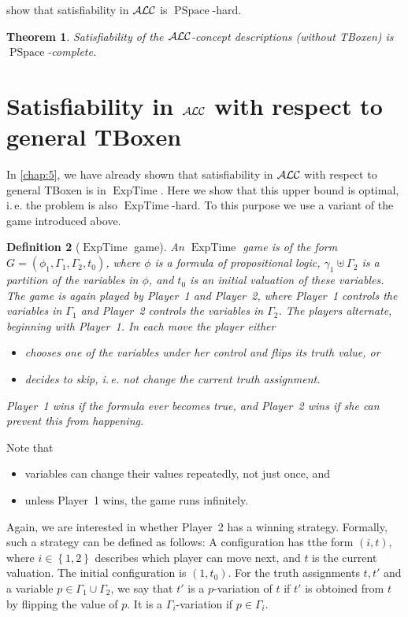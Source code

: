 \documentclass[openany]{scrbook}
\theoremstyle{break}
\newtheorem{Theorem}{Theorem}[chapter]
\newtheorem{Definition}[Theorem]{Definition}
\theoremstyle{nonumberbreak}
\theoremstyle{nonumberplain}
\theoremstyle{nonumberbreak}
\newcommand{\set}[1]{\left\{#1\right\}}
\newcommand{\ie}{i{.}\,e{.}\xspace}
\newcommand{\ALC}{{\cal A}{\cal L}{\cal C}}
\newcommand{\PSpace}{\operatorname{PSpace}}
\newcommand{\ExpTime}{\operatorname{ExpTime}}
\begin{document}
 show that satisfiability in $\ALC$ is $\PSpace$-hard.

\begin{Theorem}
  \label{6.8}
  Satisfiability of the $\ALC$-concept descriptions (without TBoxen)
  is $\PSpace$-complete.
\end{Theorem}

\section{Satisfiability in $\ALC$ with respect to general TBoxen}
In \cref{chap:5}, we have already shown that satisfiability in $\ALC$
with respect to general TBoxen is in $\ExpTime$. Here we show that
this upper bound is optimal, \ie the problem is also
$\ExpTime$-hard. To this purpose we use a variant of the game
introduced above.

\begin{Definition}[$\ExpTime$ game]
  \label{6.9}An $\ExpTime$ game is of the form $G = (\phi_1, \Gamma_1,
  \Gamma_2, t_0)$, where $\phi$ is a formula of propositional logic,
  $\gamma_1 \uplus \Gamma_2$ is a partition of the variables in
  $\phi$, and $t_0$ is an initial valuation of these variables.
  The game is again played by Player~1 and Player~2, where Player~1
  controls the variables in $\Gamma_1$ and Player~2 controls the
  variables in $\Gamma_2$. The players alternate, beginning with
  Player~1. In each move the player either
  \begin{itemize}
  \item chooses one of the variables under her control and flips its
    truth value, or
  \item decides to skip, \ie not change the current truth assignment.
  \end{itemize}
  Player~1 wins if the formula ever becomes true, and Player~2 wins if
  she can prevent this from happening.
\end{Definition}
Note that
\begin{itemize}
\item variables can change their values repeatedly, not just once, and
\item unless Player~1 wins, the game runs infinitely.
\end{itemize}

Again, we are interested in whether Player~2 has a winning
strategy. Formally, such a strategy can be defined as follows: A
configuration has tthe form $(i, t)$, where $i \in \set{1, 2}$
describes which player can move next, and $t$ is the current
valuation. The initial configuration is $(1, t_0)$. For the truth
assignments $t, t'$ and a variable $p \in \Gamma_1 \cup \Gamma_2$, we
say that $t'$ is a $p$-variation of $t$ if $t'$ is obtoined from $t$
by flipping the value of $p$. It is a $\Gamma_i$-variation if $p \in
\Gamma_i$.
\end{document}
